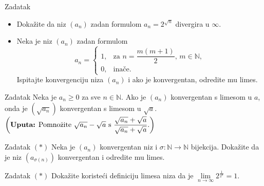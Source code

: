 \begin{exercise}{Zadatak} \textbf{}
\begin{itemize}
\item[a)] Dokažite da niz \((a_n)\) zadan formulom \(a_n=2^{\sqrt{n}}\) divergira u \(\infty\).
\item[b)] Neka je niz \((a_n)\) zadan formulom
\[a_n=\begin{cases}
1, & \text{za } n=\dfrac{m(m+1)}{2},\, m\in \mathbb{N},\\
0, & \text{inače}.
\end{cases}\]
Ispitajte konvergenciju niza \((a_n)\) i ako je konvergentan, odredite mu limes.
\end{itemize}
\end{exercise}
\begin{exercise}{Zadatak}
Neka je \(a_n\geq 0\) za sve \(n\in \mathbb{N}\). Ako je \((a_n)\) konvergentan s limesom u \(a\), onda je \((\sqrt{a_n})\) konvergentan s limesom u \(\sqrt{a}\). \(\left(\text{\textbf{Uputa:} Pomnožite }\sqrt{a_n}-\sqrt{a}\text{ s }\dfrac{\sqrt{a_n}+\sqrt{a}}{\sqrt{a_n}+\sqrt{a}}.\right)\)
\end{exercise}
\begin{exercise}{Zadatak} \((*)\)
Neka je \((a_n)\) konvergentan niz i \(\sigma : \mathbb{N}\to \mathbb{N}\) bijekcija. Dokažite da je niz \((a_{\sigma(n)})\) konvergentan i odredite mu limes.
\end{exercise}
\begin{exercise}{Zadatak} \((*)\)
Dokažite koristeći definiciju limesa niza da je \(\lim\limits_{n\to \infty}{2^{\frac{1}{2^n}}}=1\).
\end{exercise}
